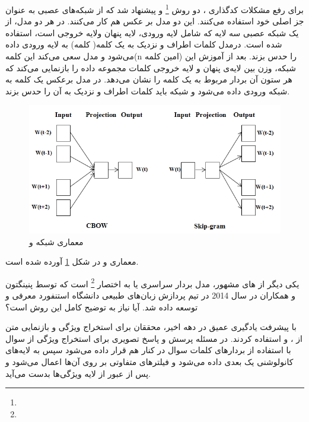 		برای رفع مشکلات کدگذاری 
		 ، دو روش
		\footnote{}
		\cite{mikolov2013efficient}
		 و
		\cite{mikolov2013efficient}
		پیشنهاد شد که از شبکه‌های عصبی به عنوان جز اصلی خود استفاده می‌کنند. این دو مدل بر عکس هم کار می‌کنند.	در هر دو مدل، از یک شبکه عصبی سه لایه که شامل لایه ورودی، لایه پنهان ولایه خروجی است، استفاده شده است. درمدل 
		 کلمات اطراف و نزدیک به یک کلمه(
		 کلمه) به لایه ورودی داده می‌شود و مدل سعی می‌کند این کلمه(n امین کلمه) را حدس بزند.  بعد از آموزش این شبکه‌، وزن بین لایه‌ی پنهان و لایه خروجی کلمات مجموعه داده را بازنمایی می‌کند که هر ستون آن بردار مربوط به یک کلمه را نشان می‌دهد. در مدل
		برعکس 
		یک کلمه به شبکه ورودی داده می‌شود و شبکه باید کلمات اطراف و نزدیک به آن را حدس بزند. 
		\begin{figure}
			\centerline{\includegraphics[scale=0.5]{images/2.png}}
			\caption{
		معماری شبکه 
			و
			}
			\label{fig:CBOW&skip-gram}
		\end{figure}
		معماری 
		و
		در شکل 
		\ref{fig:CBOW&skip-gram}
	آورده شده است.
	
		 یکی دیگر از 
		های مشهور، مدل بردار سراسری یا به اختصار 
		 \footnote{}
		 است که توسط پنینگتون و همکاران 
		 \cite{pennington2014glove}
		 در سال 2014 در تیم پردازش زبان‌های طبیعی دانشگاه استنفورد معرفی و توسعه داده شد. آیا نیاز به توضیح کامل این روش است؟
		 
		 با پیشرفت یادگیری عمیق در دهه اخیر، محققان برای استخراج ویژگی و بازنمایی متن از
		 ،
		 \cite{hochreiter1997long}
		  و
		 \cite{cho2014learning}
		 استفاده کردند. در مسئله پرسش و پاسخ تصویری برای استخراج ویژگی از سوال با استفاده از 
		 بردارهای کلمات سوال در کنار هم قرار داده می‌شود سپس به لایه‌های کانولوشنی یک بعدی داده می‌شود و فیلتر‌های متفاوتی بر روی آن‌ها اعمال می‌شود و پس از عبور از لایه‌ 
		 ویژگی‌ها بدست می‌آید.
		 

